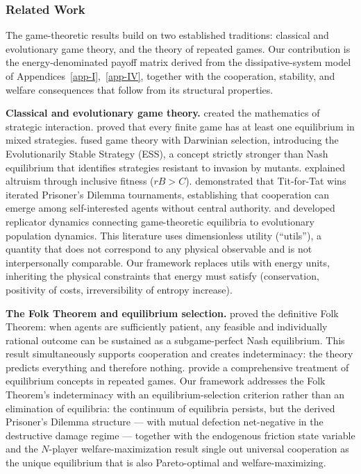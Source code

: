 \documentclass[11pt]{article}
\theoremstyle{plain}
\theoremstyle{definition}
\theoremstyle{remark}
\let\origsubsubsection\subsubsection
\renewcommand{\subsubsection}{\needspace{4\baselineskip}\origsubsubsection}
\begin{document}
\subsubsection{Related Work}\label{related-work-5}

The game-theoretic results build on two established traditions:
classical and evolutionary game theory, and the theory of repeated
games. Our contribution is the energy-denominated payoff matrix derived
from the dissipative-system model of
Appendices~\ref{app-I},~\ref{app-IV}, together with the cooperation,
stability, and welfare consequences that follow from its structural
properties.

\textbf{Classical and evolutionary game theory.} \citet{VonNeumann1944}
created the mathematics of strategic interaction. \citeauthor{Nash1950}
\citetext{\citeyear{Nash1950}; \citeyear{Nash1951}} proved that every
finite game has at least one equilibrium in mixed strategies.
\citet{MaynardSmith1973} fused game theory with Darwinian selection,
introducing the Evolutionarily Stable Strategy (ESS), a concept strictly
stronger than Nash equilibrium that identifies strategies resistant to
invasion by mutants. \citet{Hamilton1964a} explained altruism through
inclusive fitness (\(rB > C\)). \citet{Axelrod1984} demonstrated that
Tit-for-Tat wins iterated Prisoner's Dilemma tournaments, establishing
that cooperation can emerge among self-interested agents without central
authority. \citet{Taylor1978} and \citet{Weibull1995} developed
replicator dynamics connecting game-theoretic equilibria to evolutionary
population dynamics. This literature uses dimensionless utility
(``utils''), a quantity that does not correspond to any physical
observable and is not interpersonally comparable. Our framework replaces
utils with energy units, inheriting the physical constraints that energy
must satisfy (conservation, positivity of costs, irreversibility of
entropy increase).

\textbf{The Folk Theorem and equilibrium selection.}
\citet{Fudenberg1986} proved the definitive Folk Theorem: when agents
are sufficiently patient, any feasible and individually rational outcome
can be sustained as a subgame-perfect Nash equilibrium. This result
simultaneously supports cooperation and creates indeterminacy: the
theory predicts everything and therefore nothing.
\citet{OsborneRubinstein1994} provide a comprehensive treatment of
equilibrium concepts in repeated games. Our framework addresses the Folk
Theorem's indeterminacy with an equilibrium-selection criterion rather
than an elimination of equilibria: the continuum of equilibria persists,
but the derived Prisoner's Dilemma structure --- with mutual defection
net-negative in the destructive damage regime --- together with the
endogenous friction state variable and the \(N\)-player
welfare-maximization result single out universal cooperation as the
unique equilibrium that is also Pareto-optimal and welfare-maximizing.
\end{document}
